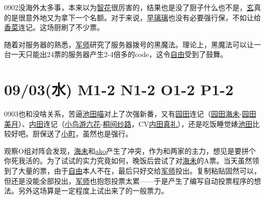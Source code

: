 0902没海外太多事，本来以为\uline{智花}很厉害的，结果也是没了厨子什么也不是，\uline{玄}真的是很意外地又为拿下一个名额。对于来说，\uline{早璃璃}也没有必要强行保，不如让给\uline{香菜}连记。这场厨刷了不少票。

随着对服务器的熟悉，\uline{军师}研究了服务器拨号的黑魔法。理论上，黑魔法可以让一台一天只能出24票的服务器产生2-4倍多的code，这令\uline{自由}受到了鼓舞。

\section{09/03(水) M1-2 N1-2 O1-2 P1-2}


0903也和没啥关系，苦逼\uline{池田喵}对上了次强新番，又有\uline{园田}连记（\uline{园田海未}-\uline{园田美月}）、\uline{内田}连记（\uline{小鸟游六花}-\uline{桐间纱路}，CV\uline{内田真礼}），还是吃饭睡觉婊\uline{池田}比较好吧。厨保送了\uline{小町}，虽然也是强行。

观察O组对阵会发现，\uline{海未}和\uline{ako}产生了冲突，作为和两家的主力，想见是要拼个你死我活的。为了试试的实力究竟如何，晚饭后尝试了对\uline{海未}的A票。当天虽然领到了大量的票，由于\uline{自由}本人不在，最后只好交给\uline{军师}投出。复制粘贴固然可以，但还是没能全部投出，\uline{军师}也抱怨投票太累——于是产生了编写自动投票程序的想法。另外这场算是一定程度上试出来了的一般票力。

